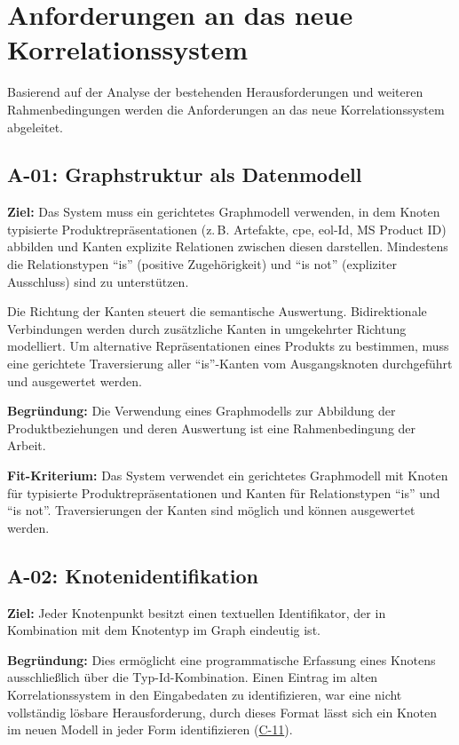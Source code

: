 \section{Anforderungen an das neue Korrelationssystem}\label{sec:requirements}

Basierend auf der Analyse der bestehenden Herausforderungen und weiteren Rahmenbedingungen werden die Anforderungen an das neue Korrelationssystem abgeleitet.

\subsection{A-01: Graphstruktur als Datenmodell}\label{subsec:req-format-product-graph}

\textbf{Ziel:}
Das System muss ein gerichtetes Graphmodell verwenden, in dem Knoten typisierte Produktrepräsentationen (z.\,B. Artefakte, \acrshort{cpe}, \acrshort{eol}-Id, MS Product ID) abbilden und Kanten explizite Relationen zwischen diesen darstellen.
Mindestens die Relationstypen \enquote{is} (positive Zugehörigkeit) und \enquote{is not} (expliziter Ausschluss) sind zu unterstützen.

Die Richtung der Kanten steuert die semantische Auswertung.
Bidirektionale Verbindungen werden durch zusätzliche Kanten in umgekehrter Richtung modelliert.
Um alternative Repräsentationen eines Produkts zu bestimmen, muss eine gerichtete Traversierung aller \enquote{is}-Kanten vom Ausgangsknoten durchgeführt und ausgewertet werden.

\textbf{Begründung:}
Die Verwendung eines Graphmodells zur Abbildung der Produktbeziehungen und deren Auswertung ist eine Rahmenbedingung der Arbeit.

\textbf{Fit-Kriterium:}
Das System verwendet ein gerichtetes Graphmodell mit Knoten für typisierte Produktrepräsentationen und Kanten für Relationstypen \enquote{is} und \enquote{is not}.
Traversierungen der Kanten sind möglich und können ausgewertet werden.

\subsection{A-02: Knotenidentifikation}\label{subsec:req-node-id-type}

\textbf{Ziel:}
Jeder Knotenpunkt besitzt einen textuellen Identifikator, der in Kombination mit dem Knotentyp im Graph eindeutig ist.

\textbf{Begründung:}
Dies ermöglicht eine programmatische Erfassung eines Knotens ausschließlich über die Typ-Id-Kombination.
Einen Eintrag im alten Korrelationssystem in den Eingabedaten zu identifizieren, war eine nicht vollständig lösbare Herausforderung, durch dieses Format lässt sich ein Knoten im neuen Modell in jeder Form identifizieren (\hyperref[subsec:c-11-finding-yaml-entries]{C-11}).

